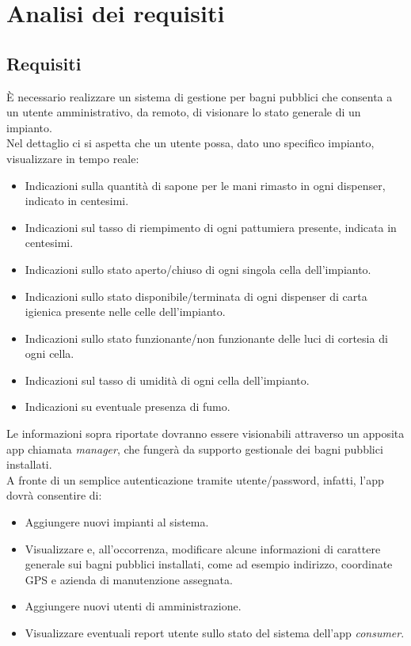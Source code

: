 \documentclass[12pt]{article}
\begin{document}
\section{Analisi dei requisiti}
\subsection{Requisiti}

È necessario realizzare un sistema di gestione per bagni pubblici che consenta a un utente amministrativo, da remoto, di visionare lo stato generale di un impianto.\\
Nel dettaglio ci si aspetta che un utente possa, dato uno specifico impianto, visualizzare in tempo reale:
\begin{itemize}
\item Indicazioni sulla quantità di sapone per le mani rimasto in ogni dispenser, indicato in centesimi.
\item Indicazioni sul tasso di riempimento di ogni pattumiera presente, indicata in centesimi.
\item Indicazioni sullo stato aperto/chiuso di ogni singola cella dell'impianto.
\item Indicazioni sullo stato disponibile/terminata di ogni dispenser di carta igienica presente nelle celle dell'impianto.
\item Indicazioni sullo stato funzionante/non funzionante delle luci di cortesia di ogni cella.
\item Indicazioni sul tasso di umidità di ogni cella dell'impianto.
\item Indicazioni su eventuale presenza di fumo.
\end{itemize}
Le informazioni sopra riportate dovranno essere visionabili attraverso un apposita app chiamata \textit{manager}, che fungerà da supporto gestionale dei bagni pubblici installati.\\
A fronte di un semplice autenticazione tramite utente/password, infatti, l'app dovrà consentire di: 
\begin{itemize}
\item Aggiungere nuovi impianti al sistema.
\item Visualizzare e, all'occorrenza, modificare alcune informazioni di carattere generale sui bagni pubblici installati, come ad esempio indirizzo, coordinate GPS e azienda di manutenzione assegnata.
\item Aggiungere nuovi utenti di amministrazione.
\item Visualizzare eventuali report utente sullo stato del sistema dell'app \textit{consumer}.
\end{itemize}
\end{document}
